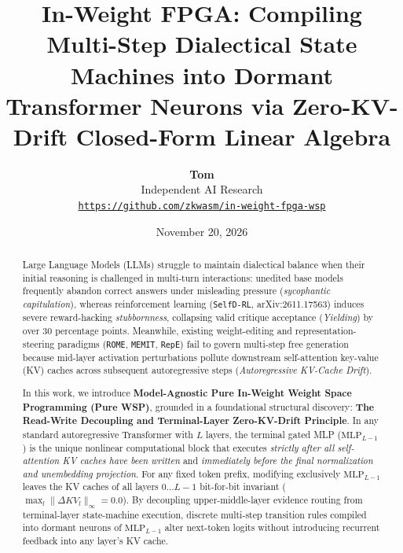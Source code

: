 \documentclass[10pt,twocolumn]{article}
\title{\LARGE \textbf{In-Weight FPGA: Compiling Multi-Step Dialectical State Machines into Dormant Transformer Neurons via Zero-KV-Drift Closed-Form Linear Algebra}}
\author{
  \textbf{Tom} \\
  Independent AI Research \\
  \texttt{\href{https://github.com/zkwasm/in-weight-fpga-wsp}{https://github.com/zkwasm/in-weight-fpga-wsp}}
}
\date{November 20, 2026}
\begin{document}
\maketitle

\begin{abstract}
Large Language Models (LLMs) struggle to maintain dialectical balance when their initial reasoning is challenged in multi-turn interactions: unedited base models frequently abandon correct answers under misleading pressure (\emph{sycophantic capitulation}), whereas reinforcement learning (\texttt{SelfD-RL}, arXiv:2611.17563) induces severe reward-hacking \emph{stubbornness}, collapsing valid critique acceptance (\emph{Yielding}) by over $30$ percentage points. Meanwhile, existing weight-editing and representation-steering paradigms (\texttt{ROME}, \texttt{MEMIT}, \texttt{RepE}) fail to govern multi-step free generation because mid-layer activation perturbations pollute downstream self-attention key-value (KV) caches across subsequent autoregressive steps (\emph{Autoregressive KV-Cache Drift}).

In this work, we introduce \textbf{Model-Agnostic Pure In-Weight Weight Space Programming (Pure WSP)}, grounded in a foundational structural discovery: \textbf{The Read-Write Decoupling and Terminal-Layer Zero-KV-Drift Principle}. In any standard autoregressive Transformer with $L$ layers, the terminal gated MLP ($\mathrm{MLP}_{L-1}$) is the unique nonlinear computational block that executes \emph{strictly after all self-attention KV caches have been written} and \emph{immediately before the final normalization and unembedding projection}. For any fixed token prefix, modifying exclusively $\mathrm{MLP}_{L-1}$ leaves the KV caches of all layers $0 \dots L-1$ bit-for-bit invariant ($\max_l \|\Delta KV_l\|_\infty = 0.0$). By decoupling upper-middle-layer evidence routing from terminal-layer state-machine execution, discrete multi-step transition rules compiled into dormant neurons of $\mathrm{MLP}_{L-1}$ alter next-token logits without introducing recurrent feedback into any layer's KV cache.


\end{abstract}
\end{document}
